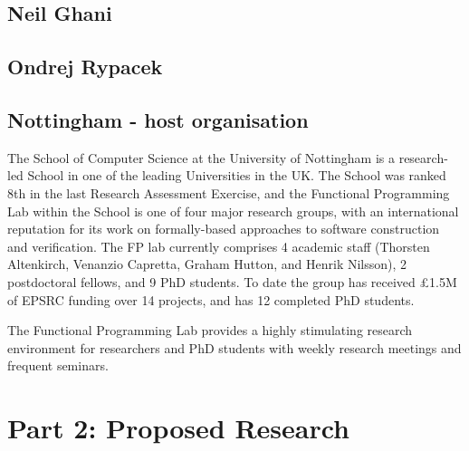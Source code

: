 \documentclass[a4paper]{article}
\renewcommand{\cite}[1]{{\tt[#1]}}
\newcommand{\citetrack}[1]{\cite{#1}}
\begin{document}
\subsection*{Neil Ghani}

\subsection*{Ondrej Rypacek}


\subsection*{Nottingham - host organisation}

The School of Computer Science at the University of Nottingham
is a research-led School in one of the leading Universities in
the UK.	 The School was ranked 8th in the last Research Assessment
Exercise, and the Functional Programming Lab within the School is
one of four major research groups, with an international reputation
for its work on formally-based approaches to software construction
and verification.  The FP lab currently comprises 4 academic staff
(Thorsten Altenkirch, Venanzio Capretta, Graham Hutton, and Henrik
Nilsson), 2 postdoctoral fellows, and 9 PhD students.  To date the
group has received \pounds 1.5M of EPSRC funding over 14 projects,
and has 12 completed PhD students.

The Functional Programming Lab provides a highly stimulating
research environment for researchers and PhD students with weekly
research meetings and frequent seminars. 



\newpage

\section*{Part 2: Proposed Research}
\end{document}
